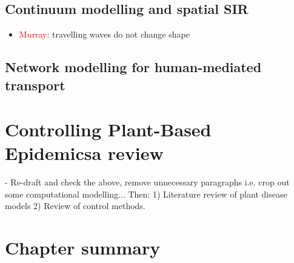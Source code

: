 \subsection{Continuum modelling and spatial SIR}
\begin{itemize}
    \item \textcolor{red}{Murray}: travelling waves do not change shape
\end{itemize}

\subsection{Network modelling for human-mediated transport}
\blindtext[1]

\section{Controlling Plant-Based Epidemics\textemdash a review}

- Re-draft and check the above, remove unnecessary paragraphs i.e. crop out some computational modelling... Then: 1) Literature review of plant disease models 2) Review of control methods.

\section{Chapter summary}